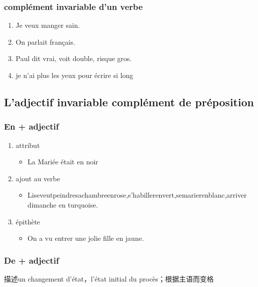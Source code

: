 \documentclass[UTF8]{report}
\begin{document}
\subsubsection{complément invariable d’un verbe}
\begin{enumerate}
    \item Je veux manger sain.
    \item On parlait français.
    \item Paul dit vrai, voit double, risque gros.
    \item  je n’ai plus les yeux pour écrire si long 
\end{enumerate}





\subsection{L’adjectif invariable complément de préposition}
\subsubsection{En + adjectif}

\begin{enumerate}
    \item attribut
    \begin{itemize}
        \item La Mariée était en noir
    \end{itemize}
    \item ajout au verbe
    \begin{itemize}
        \item Liseveutpeindresachambreenrose,s’habillerenvert,semarierenblanc,arriver dimanche en turquoise.
    \end{itemize}
    \item épithète
    \begin{itemize}
        \item On a vu entrer une jolie fille en jaune.
    \end{itemize}
\end{enumerate}


\subsubsection{De + adjectif}
描述un changement d’état，l’état initial du procès；根据主语而变格
\end{document}
